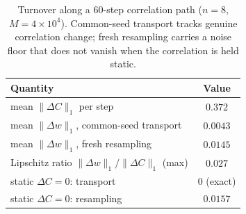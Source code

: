 \begin{table}[h]
  \centering
  \caption{Turnover along a $60$-step correlation path ($n = 8$,
  $M = 4\times10^4$). Common-seed transport tracks genuine correlation change;
  fresh resampling carries a noise floor that does not vanish when the
  correlation is held static.}
  \label{tab:turnover}
  \begin{tabular}{lc}
    \toprule
    Quantity & Value \\
    \midrule
    mean $\|\Delta C\|_1$ per step                          & $0.372$ \\
    mean $\|\Delta w\|_1$, common-seed transport            & $0.0043$ \\
    mean $\|\Delta w\|_1$, fresh resampling                 & $0.0145$ \\
    Lipschitz ratio $\|\Delta w\|_1 / \|\Delta C\|_1$ (max) & $0.027$ \\
    static $\Delta C = 0$: transport                        & $0$ (exact) \\
    static $\Delta C = 0$: resampling                       & $0.0157$ \\
    \bottomrule
  \end{tabular}
\end{table}

